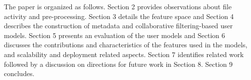 {%

The paper is organized as follows. 
  Section 2 provides observations about file activity and pre-processing.
  Section 3 details the feature space and
  Section 4 describes the construction of metadata and collaborative filtering-based user models.
  Section 5 presents an evaluation of the user models and 
  Section 6 discusses the contributions and characteristics of the features used
  in the models, and scalability and deployment related aspects. 
  Section 7 identifies related work followed by a discussion on directions for future work in Section 8. Section 9 concludes. 
}
